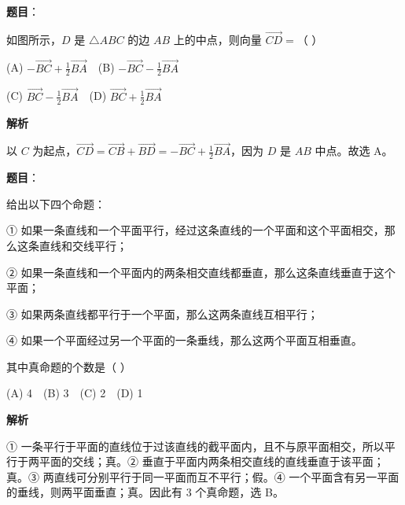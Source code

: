 \begin{answer}

\textbf{题目}：

如图所示，\(D\) 是 \(\triangle ABC\) 的边 \(AB\) 上的中点，则向量 \(\overrightarrow{CD}=\)（  ）

(A) \(-\overrightarrow{BC}+\frac12\overrightarrow{BA}\)　(B) \(-\overrightarrow{BC}-\frac12\overrightarrow{BA}\)

(C) \(\overrightarrow{BC}-\frac12\overrightarrow{BA}\)　(D) \(\overrightarrow{BC}+\frac12\overrightarrow{BA}\)
\nopagebreak[4]
\begin{center}\end{center}
\nopagebreak[4]
\textbf{解析}

以 $C$ 为起点，$\overrightarrow{CD}=\overrightarrow{CB}+\overrightarrow{BD}=-\overrightarrow{BC}+\tfrac12\overrightarrow{BA}$，因为 $D$ 是 $AB$ 中点。故选 A。


\end{answer}
\begin{answer}

\textbf{题目}：

给出以下四个命题：

① 如果一条直线和一个平面平行，经过这条直线的一个平面和这个平面相交，那么这条直线和交线平行；

② 如果一条直线和一个平面内的两条相交直线都垂直，那么这条直线垂直于这个平面；

③ 如果两条直线都平行于一个平面，那么这两条直线互相平行；

④ 如果一个平面经过另一个平面的一条垂线，那么这两个平面互相垂直。

其中真命题的个数是（  ）

(A) 4　(B) 3　(C) 2　(D) 1

\textbf{解析}

① 一条平行于平面的直线位于过该直线的截平面内，且不与原平面相交，所以平行于两平面的交线；真。② 垂直于平面内两条相交直线的直线垂直于该平面；真。③ 两直线可分别平行于同一平面而互不平行；假。④ 一个平面含有另一平面的垂线，则两平面垂直；真。因此有 3 个真命题，选 B。


\end{answer}
